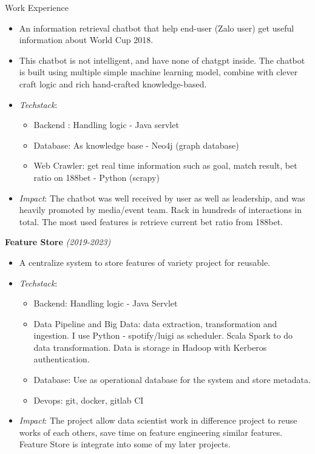 \documentclass{resume} %
\begin{document}
\begin{rSection}{Work Experience}
\begin{itemize}
    \item An information retrieval chatbot that help end-user (Zalo user) get useful information about World Cup 2018.
    \item This chatbot is not intelligent, and have none of chatgpt inside. The chatbot is built using multiple simple machine learning model, combine with clever craft logic and rich hand-crafted knowledge-based.
    \item \textit{Techstack}: 
    \begin{itemize}
            \item Backend : Handling logic - Java servlet
            \item Database: As knowledge base - Neo4j (graph database)
            \item Web Crawler: get real time information such as goal, match result, bet ratio on 188bet - Python (scrapy)
    \end{itemize}
    \item \textit{Impact}: The chatbot was well received by user as well as leadership, and was heavily promoted by media/event team. Rack in hundreds of interactions in total. The most used features is retrieve current bet ratio from 188bet.
\end{itemize}


\textbf{Feature Store} \textit{(2019-2023)}
\begin{itemize}
    \item A centralize system to store features of variety project for reusable.
    \item \textit{Techstack}:
    \begin{itemize}
        \item Backend: Handling logic - Java Servlet
        \item Data Pipeline and Big Data: data extraction, transformation and ingestion. I use Python - spotify/luigi as scheduler. Scala Spark to do data transformation. Data is storage in Hadoop with Kerberos authentication.
        \item Database: Use as operational database for the system and store metadata.
        \item Devops: git, docker, gitlab CI
    \end{itemize} 
    \item \textit{Impact}: The project allow data scientist work in difference project to reuse works of each others, save time on feature engineering similar features. Feature Store is integrate into some of my later projects.
\end{itemize}



\end{rSection}
\end{document}
